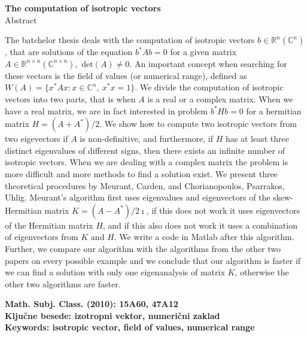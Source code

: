 \documentclass[12pt,a4paper]{amsart}
\theoremstyle{definition}
\theoremstyle{plain}
\newcommand{\R}{\mathbb R}
\newcommand{\C}{\mathbb C}
\begin{document}
\vfill
\begin{center}
{\bf The computation of isotropic vectors}\\[3mm]
{\sc Abstract}
\end{center}
The batchelor thesis deals with the computation of isotropic vectors $b\in\R^{n} (\C^{n})$, that are solutions of the equation $b^\ast Ab=0$ for a given matrix $A\in\R^{n\times n} (\C^{n\times n}),$ $\text{det}(A)\ne 0$.
An important concept when searching for these vectors is the field of values (or numerical range), defined as $W(A)=\{x^\ast Ax\! : x \in \C^n,\ x^\ast x=1\}.$ %
We divide the computation of isotropic vectors into two parts, that is when $A$ is a real or a complex matrix.
When we have a real matrix, we are in fact interested in problem $b^\ast Hb=0$ for a hermitian matrix $H=(A+A^\ast)/2$.
We show how to compute two isotropic vectors from two eigevectors if $A$ is non-definitive, and furthermore, if $H$ has at least three distinct eigenvalues of different signs, then there exists an infinite number of isotropic vectors.
When we are dealing with a complex matrix the problem is more difficult and more methods to find a solution exist. We present three theoretical procedures by Meurant, Carden, and Chorianopoulos, Psarrakos, Uhlig.
Meurant's algorithm first uses eigenvalues and eigenvectors of the skew-Hermitian matrix $K=(A-A^\ast)/2\imath$, if this does not work it uses eigenvectors of the Hermitian matrix $H$, and if this also does not work it uses a combination of eigenvectors from $K$ and $H$.
We write a code in Matlab after this algorithm.
Further, we compare our algorithm with the algorithms from the other two papers on every possible example and we conclude that our algorithm is faster if we can find a solution with only one eigenanalysis of matrix $K$, otherwise the other two algorithms are faster.


\vfill\noindent
{\bf Math. Subj. Class. (2010): 15A60, 47A12}   \\[1mm]
{\bf Ključne besede: izotropni vektor, numerični zaklad}   \\[1mm]
{\bf Keywords: isotropic vector, field of values, numerical range}
\pagebreak
\end{document}
